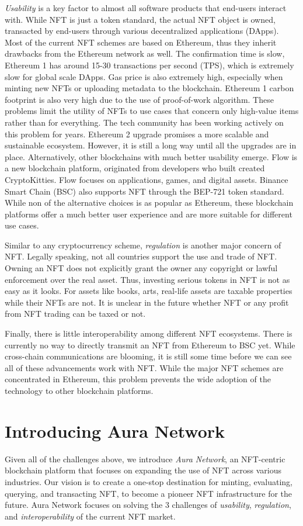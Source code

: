 \documentclass[12pt, titlepage]{article}
\begin{document}
\emph{Usability} is a key factor to almost all software products that end-users interact with. While NFT is just a token standard, the actual NFT object is owned, transacted by end-users through various decentralized applications (DApps). Most of the current NFT schemes are based on Ethereum, thus they inherit drawbacks from the Ethereum network as well. The confirmation time is slow, Ethereum 1 has around 15-30 transactions per second (TPS), which is extremely slow for global scale DApps. Gas price is also extremely high, especially when minting new NFTs or uploading metadata to the blockchain. Ethereum 1 carbon footprint is also very high due to the use of proof-of-work algorithm. These problems limit the utility of NFTs to use cases that concern only high-value items rather than for everything. The tech community has been working actively on this problem for years. Ethereum 2 upgrade promises a more scalable and sustainable ecosystem. However, it is still a long way until all the upgrades are in place. Alternatively, other blockchains with much better usability emerge. Flow is a new blockchain platform, originated from developers who built created CryptoKitties. Flow focuses on applications, games, and digital assets. Binance Smart Chain (BSC) also supports NFT through the BEP-721 token standard. While non of the alternative choices is as popular as Ethereum, these blockchain platforms offer a much better user experience and are more suitable for different use cases. 

Similar to any cryptocurrency scheme, \emph{regulation} is another major concern of NFT. Legally speaking, not all countries support the use and trade of NFT. Owning an NFT does not explicitly grant the owner any copyright or lawful enforcement over the real asset. Thus, investing serious tokens in NFT is not as easy as it looks. For assets like books, arts, real-life assets are taxable properties while their NFTs are not. It is unclear in the future whether NFT or any profit from NFT trading can be taxed or not.

Finally, there is little interoperability among different NFT ecosystems. There is currently no way to directly transmit an NFT from Ethereum to BSC yet. While cross-chain communications are blooming, it is still some time before we can see all of these advancements work with NFT. While the major NFT schemes are concentrated in Ethereum, this problem prevents the wide adoption of the technology to other blockchain platforms.

\section{Introducing Aura Network}
Given all of the challenges above, we introduce \emph{Aura Network}, an NFT-centric blockchain platform that focuses on expanding the use of NFT across various industries. Our vision is to create a one-stop destination for minting, evaluating, querying, and transacting NFT, to become a pioneer NFT infrastructure for the future. Aura Network focuses on solving the 3 challenges of \emph{usability}, \emph{regulation}, and \emph{interoperability} of the current NFT market.
\end{document}
